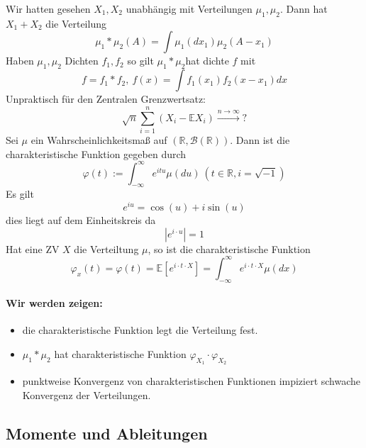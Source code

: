 \documentclass[10pt,a4paper]{report}
\numberwithin{equation}{section}
\numberwithin{figure}{section}
\theoremstyle{plain}
\theoremstyle{definition}
\theoremstyle{remark}
\theoremstyle{plain}
\newcommand{\1}{ \mathbb{1} } %
\begin{document}
 Wir hatten gesehen $X_{1},X_{2}$
unabhängig mit Verteilungen $\mu_{1},\mu_{2}$. Dann hat $X_{1}+X_{2}$
die Verteilung
\[
\mu_{1}*\mu_{2}\left(A\right)=\int\mu_{1}\left(dx_{1}\right)\mu_{2}\left(A-x_{1}\right)
\]
Haben $\mu_{1},\mu_{2}$ Dichten $f_{1},f_{2}$ so gilt $\mu_{1}*\mu_{2}$hat
dichte $f$ mit 
\[
f=f_{1}*f_{2},\ f\left(x\right)=\int f_{1}\left(x_{1}\right)f_{2}\left(x-x_{1}\right)dx
\]
Unpraktisch für den Zentralen Grenzwertsatz:
\[
\sqrt{n}\sum_{i=1}^{n}\left(X_{i}-\mathbb{E}X_{i}\right)\overset{n\to\infty}{\longrightarrow}?
\]
Sei $\mu$ ein Wahrscheinlichkeitsmaß auf $\left(\mathbb{R},\mathcal{B}\left(\mathbb{R}\right)\right)$.
Dann ist die charakteristische Funktion gegeben durch 
\[
\varphi\left(t\right):=\int_{-\infty}^{\infty}e^{itu}\mu\left(du\right)\ \left(t\in\mathbb{R},i=\sqrt{-1}\right)
\]
Es gilt 
\[
e^{iu}=\cos\left(u\right)+i\sin\left(u\right)
\]
dies liegt auf dem Einheitskreis da
\[
\left|e^{i\cdot u}\right|=1
\]
Hat eine ZV $X$ die Verteiltung $\mu$, so ist die charakteristische
Funktion
\[
\varphi_{x}\left(t\right)=\varphi\left(t\right)=\mathbb{E}\left[e^{i\cdot t\cdot X}\right]=\int_{-\infty}^{\infty}e^{i\cdot t\cdot X}\mu\left(dx\right)
\]



\paragraph*{Wir werden zeigen:}
\begin{itemize}
\item die charakteristische Funktion legt die Verteilung fest.
\item $\mu_{1}*\mu_{2}$ hat charakteristische Funktion $\varphi_{X_{1}}\cdot\varphi_{X_{2}}$
\item punktweise Konvergenz von charakteristischen Funktionen impiziert
schwache Konvergenz der Verteilungen.
\end{itemize}

\subsection*{Momente und Ableitungen}
\end{document}
